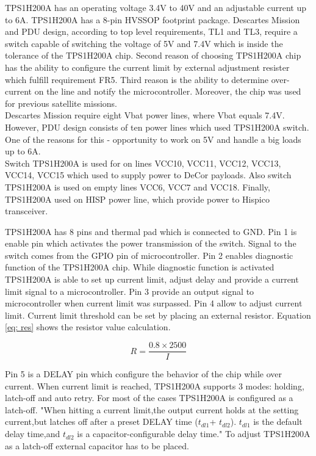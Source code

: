 TPS1H200A \cite{28} has an operating voltage 3.4V to 40V and an adjustable current up to 6A. TPS1H200A has a 8-pin HVSSOP footprint package. Descartes Mission and PDU design, according to top level requirements, TL1 and TL3, require a switch capable of switching the voltage of 5V and 7.4V which is inside the tolerance of the TPS1H200A chip. Second reason of choosing TPS1H200A chip has the ability to configure the current limit by external adjustment resister  which fulfill requirement FR5. Third reason is the ability to determine over-current on the line and notify the microcontroller. Moreover, the chip was used for previous satellite missions.\\

Descartes Mission require eight Vbat power lines, where Vbat equals 7.4V. However, PDU design consists of ten power lines which used TPS1H200A switch. One of the reasons for this - opportunity to work on 5V and handle a big loads up to 6A. \\ 

Switch TPS1H200A is used for on lines VCC10, VCC11, VCC12, VCC13, VCC14, VCC15 which used to supply power to DeCor payloads. Also switch TPS1H200A is used on empty lines VCC6, VCC7 and VCC18. Finally, TPS1H200A used on HISP power line, which provide power to Hispico transceiver. 

TPS1H200A has 8 pins and thermal pad which is connected to GND. Pin 1 is enable pin which activates the power transmission of the switch. Signal to the switch comes from the GPIO pin of microcontroller. Pin 2 enables diagnostic function of the TPS1H200A chip. While diagnostic function is activated TPS1H200A is able to set up current limit, adjust delay and provide a current limit signal to a microcontroller. Pin 3 provide an output signal to microcontroller when current limit was surpassed. Pin 4 allow to adjust current limit. Current limit threshold can be set by placing an external resistor. Equation \ref{eq: res} shows the resistor value calculation.

\begin{equation}\label{eq: res}
R = \frac{0.8 \times 2500}{I}
\end{equation}


Pin 5 is a DELAY pin which configure the behavior of the chip while over current. When current limit is reached, TPS1H200A supports 3 modes: holding, latch-off and auto retry. For most of the cases TPS1H200A is configured as a latch-off. \cite{28} "When hitting a current limit,the output current holds at the setting current,but latches off after a preset DELAY time ($t_{dl1}$+ $t_{dl2}$). $t_{dl1}$ is the default delay time,and $t_{dl2}$ is a capacitor-configurable delay time." To adjust TPS1H200A as a latch-off external capacitor has to be placed. 

